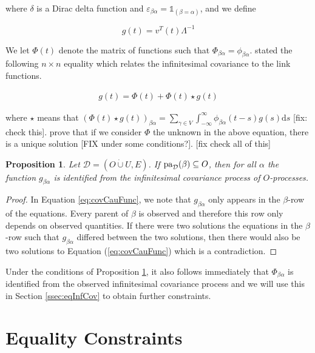 \documentclass[accepted]{uai2021} %
\newcommand{\md}{\mathrm{d}}
\newtheorem{prop}[thm]{Proposition}
\newcommand{\pa}{\textnormal{pa}}
\newcommand{\disjU}{\mathbin{\dot{\cup}}}
\begin{document}
where $\delta$ is a Dirac delta function and $\varepsilon_{\beta\alpha} = 
\mathds{1}_{(\beta=\alpha)}$, and we define

$$
g(t) = v^T(t)\Lambda^{-1}
$$

We let $\Phi(t)$ denote the matrix of functions such that $\Phi_{\beta\alpha} = 
\phi_{\beta\alpha}$. \cite{hawkesJRSSB1971} stated the following $n\times n$ 
equality 
which 
relates the infinitesimal covariance to the link functions.

\begin{align}
	g(t) = \Phi(t) + \Phi(t) \star g(t)
	\label{eq:covCauFunc}
\end{align}

where $\star$ means that $(\Phi(t) \star g(t))_{\beta\alpha} = \sum_{\gamma \in 
V} 
\int_{-\infty}^{\infty} \phi_{\beta\alpha}(t - s) g(s) \md s$ [fix: check 
this]. \cite{bacry2016} 
prove that if we consider $\Phi$ 
the 
unknown in the above equation, there is a unique solution [FIX under some 
conditions?]. [fix check all of 
this] 

\begin{prop}
	Let $\mathcal{D} = (O\disjU U, E)$. If $\pa_\mathcal{D}(\beta) \subseteq 
	O$, then for all $\alpha$ the function $g_{\beta\alpha}$ is identified from 
	the infinitesimal covariance process of $O$-processes.
	\label{prop:gPaId}
\end{prop}

\begin{proof}
	In Equation \ref{eq:covCauFunc}, we note that $g_{\beta\alpha}$ only 
	appears in the $\beta$-row of the equations. Every parent of $\beta$ is 
	observed and therefore this row only depends on observed quantities. If 
	there were two solutions the equations in the $\beta$-row such that 
	$g_{\beta\alpha}$ differed between the two solutions, then there would also 
	be two solutions to Equation (\ref{eq:covCauFunc}) which is a contradiction.
\end{proof}

Under the conditions of Proposition \ref{prop:gPaId}, it also follows 
immediately that $\Phi_{\beta\alpha}$ is identified from the observed 
infinitesimal covariance process and we will use this in Section 
\ref{ssec:eqInfCov} to obtain further constraints.


\section{Equality Constraints}
\end{document}
